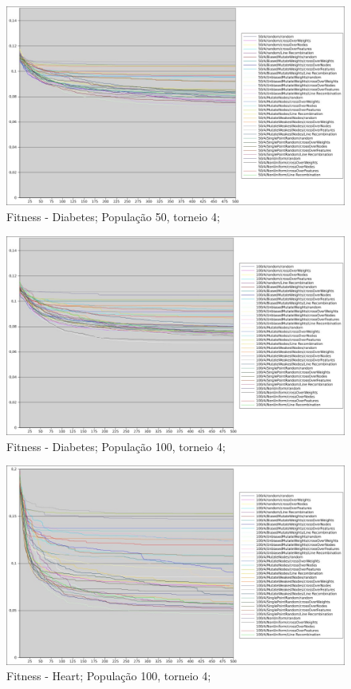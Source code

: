 \documentclass[12pt]{article}
\begin{document}
\begin{figure}[htp]
\center
\includegraphics[scale=0.4, keepaspectratio]{dia_50_4.jpg} 
\caption{Fitness - Diabetes; População 50, torneio 4;}
\label{fig:dia50.4}
\end{figure}

\begin{figure}[hbp]
\center
\includegraphics[scale=0.4, keepaspectratio]{dia_100_4.jpg} 
\caption{Fitness - Diabetes; População 100, torneio 4;}
\label{fig:dia100.4}
\end{figure}

\begin{figure}[htp]
\center
\includegraphics[scale=0.4, keepaspectratio]{hea_100_4.jpg} 
\caption{Fitness - Heart; População 100, torneio 4;}
\label{fig:hea100.4}
\end{figure}
\end{document}
